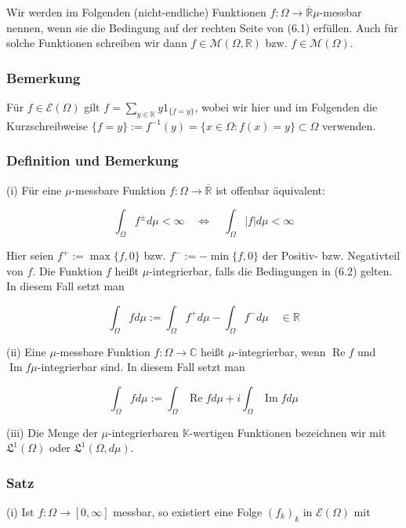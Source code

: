 \documentclass[10pt, letterpaper]{article}
\begin{document}
Wir werden im Folgenden (nicht-endliche) Funktionen $f: \Omega \rightarrow \overline{\mathbb{R}} \mu$-messbar nennen, wenn sie die Bedingung auf der rechten Seite von (6.1) erfüllen. Auch für solche Funktionen schreiben wir dann $f \in \mathcal{M}(\Omega, \mathbb{R})$ bzw. $f \in \mathcal{M}(\Omega)$.

\subsubsection*{Bemerkung}
Für $f \in \mathcal{E}(\Omega)$ gilt $f=\sum_{y \in \mathbb{K}} y 1_{\{f=y\}}$, wobei wir hier und im Folgenden die Kurzschreibweise $\{f=y\}:=f^{-1}(y)=\{x \in \Omega: f(x)=y\} \subset \Omega$ verwenden.

\subsubsection*{Definition und Bemerkung}
(i) Für eine $\mu$-messbare Funktion $f: \Omega \rightarrow \overline{\mathbb{R}}$ ist offenbar äquivalent:

$$
\int_{\Omega} f^{ \pm} d \mu<\infty \quad \Longleftrightarrow \quad \int_{\Omega}|f| d \mu<\infty
$$

Hier seien $f^{+}:=\max \{f, 0\}$ bzw. $f^{-}:=-\min \{f, 0\}$ der Positiv- bzw. Negativteil von $f$. Die Funktion $f$ heißt $\mu$-integrierbar, falls die Bedingungen in (6.2) gelten. In diesem Fall setzt man

$$
\int_{\Omega} f d \mu:=\int_{\Omega} f^{+} d \mu-\int_{\Omega} f^{-} d \mu \quad \in \mathbb{R}
$$

(ii) Eine $\mu$-messbare Funktion $f: \Omega \rightarrow \mathbb{C}$ heißt $\mu$-integrierbar, wenn $\operatorname{Re} f$ und $\operatorname{Im} f \mu$-integrierbar sind. In diesem Fall setzt man

$$
\int_{\Omega} f d \mu:=\int_{\Omega} \operatorname{Re} f d \mu+i \int_{\Omega} \operatorname{Im} f d \mu
$$

(iii) Die Menge der $\mu$-integrierbaren $\mathbb{K}$-wertigen Funktionen bezeichnen wir mit $\mathfrak{L}^{1}(\Omega)$ oder $\mathfrak{L}^{1}(\Omega, d \mu)$.

\subsubsection*{Satz}
(i) Ist $f: \Omega \rightarrow[0, \infty]$ messbar, so existiert eine Folge $\left(f_{k}\right)_{k}$ in $\mathcal{E}(\Omega)$ mit
\end{document}
